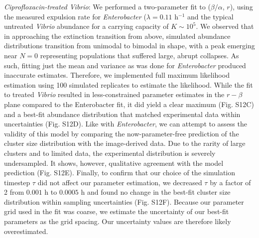 \documentclass[12pt]{article}
\begin{document}
\textit{Ciprofloxacin-treated Vibrio}: We performed a two-parameter fit to ($\beta/\alpha$, $r$), using the measured expulsion rate for \textit{Enterobacter} ($\lambda = 0.11$ h$^{-1}$ and the typical untreated \textit{Vibrio} abundance for a carrying capacity of $K \sim 10^5$. We observed that in approaching the extinction transition from above, simulated abundance distributions transition from unimodal to bimodal in shape, with a peak emerging near $N=0$ representing populations that suffered large, abrupt collapses. As such, fitting just the mean and variance as was done for \textit{Enterobacter} produced inaccurate estimates. Therefore, we implemented full maximum likelihood estimation using 100 simulated replicates to estimate the likelihood. While the fit to treated \textit{Vibrio} resulted in less-constrained parameter estimates in the $r-\beta$ plane compared to the Enterobacter fit, it did yield a clear maximum (Fig. S12C) and a best-fit abundance distribution that matched experimental data within uncertainties (Fig. S12D). Like with \textit{Enterobacter}, we can attempt to assess the validity of this model by comparing the now-parameter-free prediction of the cluster size distribution with the image-derived data. Due to the rarity of large clusters and to limited data, the experimental distribution is severely undersampled. It shows, however, qualitative agreement with the model prediction (Fig. S12E). Finally, to confirm that our choice of the simulation timestep $\tau$ did not affect our parameter estimation, we decreased $\tau$ by a factor of 2 from $0.001$ h to $0.0005$ h and found no change in the best-fit cluster size distribution within sampling uncertainties (Fig. S12F). Because our parameter grid used in the fit was coarse, we estimate the uncertainty of our best-fit parameters as the grid spacing. Our uncertainty values are therefore likely overestimated.




  

\newpage
{}

%
\end{document}
